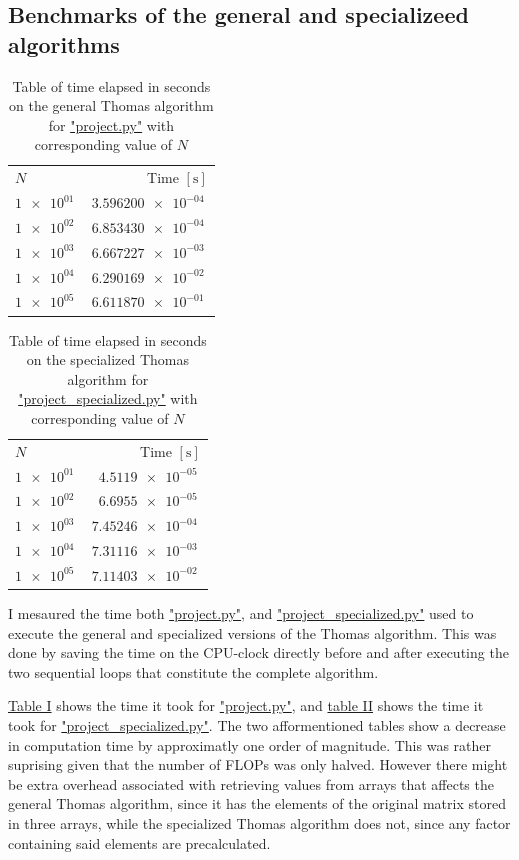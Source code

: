 \documentclass[english,notitlepage,reprint]{revtex4-1}  %
\begin{document}
\subsection{Benchmarks of the general and specializeed algorithms}\label{subsec:42}
\begin{table}[H]
	\centering
	\label{tab:421}
	\begin{tabular}{l|r}
	\(N\) & Time \([\si{\second}]\) \\
	\(\SI{1e+01}{}\) & \(\SI{3.596200e-04}{}\) \\
	\(\SI{1e+02}{}\) & \(\SI{6.853430e-04}{}\) \\
	\(\SI{1e+03}{}\) & \(\SI{6.667227e-03}{}\) \\
	\(\SI{1e+04}{}\) & \(\SI{6.290169e-02}{}\) \\
	\(\SI{1e+05}{}\) & \(\SI{6.611870e-01}{}\) \\
	\end{tabular}
	\caption{Table of time elapsed in seconds on the general Thomas algorithm for
	\hyperref[A:1]{"project.py"} with corresponding value of \(N\)}
\end{table}

\begin{table}[H]
	\centering
	\label{tab:422}
	\begin{tabular}{l|r}
	\(N\) & Time \([\si{\second}]\) \\
	\(\SI{1e+01}{}\) & \(\SI{4.5119e-05}{}\) \\
	\(\SI{1e+02}{}\) & \(\SI{6.6955e-05}{}\) \\
	\(\SI{1e+03}{}\) & \(\SI{7.45246e-04}{}\) \\
	\(\SI{1e+04}{}\) & \(\SI{7.31116e-03}{}\) \\
	\(\SI{1e+05}{}\) & \(\SI{7.11403e-02}{}\) \\
	\end{tabular}
	\caption{Table of time elapsed in seconds on the specialized Thomas algorithm for
	\hyperref[A:2]{"project\_specialized.py"} with corresponding value of \(N\)}
\end{table}

I mesaured the time both \hyperref[A:1]{"project.py"}, and \hyperref[A:2]{"project\_specialized.py"} used to execute the general and specialized versions of the Thomas algorithm. This was done by saving the time on the CPU-clock directly before and after executing the two sequential loops that constitute the complete algorithm.

\hyperref[tab:421]{Table I} shows the time it took for \hyperref[A:1]{"project.py"}, and \hyperref[tab:422]{table II}
shows the time it took for \hyperref[A:2]{"project\_specialized.py"}. The two afformentioned tables show a decrease in computation time by approximatly one order of magnitude. This was rather suprising given that the number of FLOPs was only halved. However there might be extra overhead associated with retrieving values from arrays that affects the general Thomas algorithm, since it has the elements of the original matrix stored in three arrays, while the specialized Thomas algorithm does not, since any factor containing said elements are precalculated.
\end{document}

